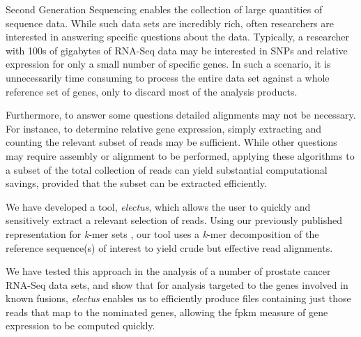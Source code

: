 \documentclass{article}
\begin{document}
Second Generation Sequencing enables the collection of large quantities of sequence data.
While such data sets are incredibly rich, often researchers are interested in answering specific questions about the data.
Typically, a researcher with 100s of gigabytes of RNA-Seq data may be interested in SNPs and relative expression for only a small number of specific genes.
In such a scenario, it is unnecessarily time consuming to process the entire data set against a whole reference set of genes, only to discard most of the analysis products.

Furthermore, to answer some questions detailed alignments may not be necessary. For instance, to determine relative gene expression, simply extracting and counting the relevant subset of reads may be sufficient.
While other questions may require assembly or alignment to be performed, applying these algorithms to a subset of the total collection of reads can yield substantial computational savings, provided that the subset can be extracted efficiently.

We have developed a tool, \textit{electus}, which allows the user to quickly and sensitively extract a relevant selection of reads. Using our previously published representation for \textit{k}-mer sets \cite{ConwayBromage2011}, our tool uses a \textit{k}-mer decomposition of the reference sequence(s) of interest to yield crude but effective read alignments.

We have tested this approach in the analysis of a number of prostate cancer RNA-Seq data sets,
and show that for analysis targeted to the genes involved in known fusions,
\textit{electus} enables us to efficiently produce files containing just those reads that map to the nominated genes, allowing the fpkm \cite{fpkm} measure of gene expression to be computed quickly.
\end{document}
